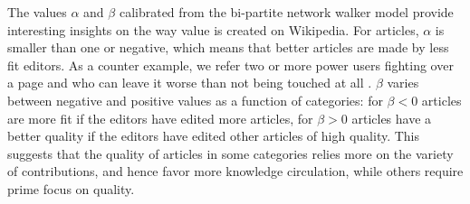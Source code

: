 The values $\alpha$ and $\beta$ calibrated from the bi-partite network walker model provide interesting insights on the way value is created on Wikipedia. For articles, $\alpha$ is smaller than one or negative, which means that better articles are made by less fit editors. As a counter example, we refer two or more power users fighting over a page and who can leave it worse than not being touched at all \cite{halfaker2013}.  $\beta$ varies between negative and positive values as a function of categories: for $\beta < 0$ articles are more fit if the editors have edited more articles, for $\beta > 0$ articles have a better quality if the editors have edited other articles of high quality. This suggests that the quality of articles in some categories relies more on the variety of contributions, and hence favor more knowledge circulation, while others require prime focus on quality.


